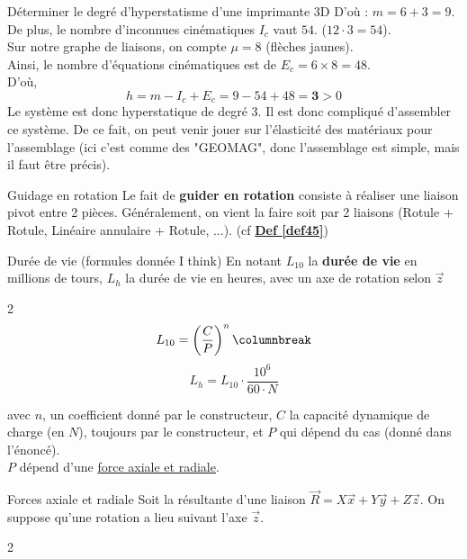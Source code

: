 \documentclass{article} %
\begin{document}
{\begin{exemple}{Déterminer le degré d'hyperstatisme d'une imprimante 3D}
D'où : $m=6+3=9$.\\
De plus, le nombre d'inconnues cinématiques $I_c$ vaut $54$. ($12\cdot 3=54$).\\
Sur notre graphe de liaisons, on compte $\mu=8$ (flèches jaunes).\\
Ainsi, le nombre d'équations cinématiques est de $E_c=6\times 8=48$.\\
D'où,\vspace*{-7pt}
$$h=m-I_c+E_c=9-54+48=\bm{3}>0$$
Le système est donc hyperstatique de degré 3. Il est donc compliqué d'assembler ce système. De ce fait, on peut venir jouer sur l'élasticité des matériaux pour l'assemblage (ici c'est comme des "GEOMAG", donc l'assemblage est simple, mais il faut être précis).
\end{exemple}\pagebreak
{}
{}
\vspace*{4pt}
\begin{definition}{Guidage en rotation}
Le fait de \textbf{guider en rotation} consiste à réaliser une liaison pivot entre 2 pièces. Généralement, on vient la faire soit par 2 liaisons (Rotule + Rotule, Linéaire annulaire + Rotule, ...). (cf \hyperref[def45]{\textcolor{mygreen}{\textbf{Def \ref*{def45}}}})
\end{definition}
\begin{definition}{Durée de vie (formules donnée I think)}
En notant $L_{10}$ la\textbf{ durée de vie} en millions de tours, $L_h$ la durée de vie en heures, avec un axe de rotation selon $\vec{z}$\vspace*{-7pt}
\begin{multicols}{2}
\noindent$$L_{10}=\left(\dfrac{C}{P}\right)^n \columnbreak$$
$$L_h=L_{10}\cdot \dfrac{10^6}{60\cdot N}$$
\end{multicols}
avec $n$, un coefficient donné par le constructeur, $C$ la capacité dynamique de charge (en $N$), toujours par le constructeur, et $P$ qui dépend du cas (donné dans l'énoncé).\\
$P$ dépend d'une \hyperref[defaxialeetradiale]{force axiale et radiale}.
\end{definition}
\begin{definition}[label=defaxialeetradiale]{Forces axiale et radiale}
Soit la résultante d'une liaison $\overrightarrow{R} = X \vec{x} + Y \vec{y} + Z \vec{z}$. On suppose qu'une rotation a lieu suivant l'axe $\vec{z}$.\vspace*{-8pt}
\begin{multicols}{2}

\end{multicols}
\end{definition}}
\end{document}
